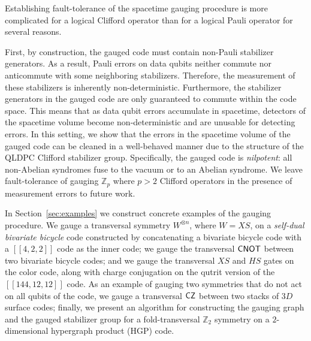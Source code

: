 \documentclass[11pt]{article}
\begin{document}
\noindent Establishing fault-tolerance of the spacetime gauging procedure is more complicated for a logical Clifford operator than for a logical Pauli operator for several reasons.


First, by construction, the gauged code must contain non-Pauli stabilizer generators.
As a result, Pauli errors on data qubits neither commute nor anticommute with some neighboring stabilizers.
Therefore, the measurement of these stabilizers is inherently non-deterministic.
Furthermore, the stabilizer generators in the gauged code are only guaranteed to commute within the code space. 
This means that as data qubit errors accumulate in spacetime, detectors of the spacetime volume become non-deterministic and are unusable for detecting errors. 
In this setting, we show that the errors in the spacetime volume of the gauged code can be cleaned in a well-behaved manner due to the structure of the QLDPC Clifford stabilizer group. Specifically, the gauged code is \emph{nilpotent}: all non-Abelian syndromes fuse to the vacuum or to an Abelian syndrome. 
We leave fault-tolerance of gauging $\mathbb{Z}_p$ where $p>2$ Clifford operators in the presence of measurement errors to future work.

In Section~\ref{sec:examples} we construct concrete examples of the gauging procedure.
We gauge a transversal symmetry $W^{\otimes n}$, where $W=XS$, on a \textit{self-dual bivariate bicycle} code constructed by concatenating a bivariate bicycle code with a $[[4,2,2]]$ code as the inner code; we gauge the transversal $\mathsf{CNOT}$ between two bivariate bicycle codes; and we gauge the transversal $XS$ and $HS$ gates on the color code, along with charge conjugation on the qutrit version of the $[[144,12,12]]$ code.
As an example of gauging two symmetries that do not act on all qubits of the code, we gauge a transversal $\mathsf{CZ}$ between two stacks of $3D$ surface codes; finally, we present an algorithm for constructing the gauging graph and the gauged stabilizer group for a fold-transversal $\mathbb{Z}_2$ symmetry on a $2$-dimensional hypergraph product (HGP) code.
\end{document}
